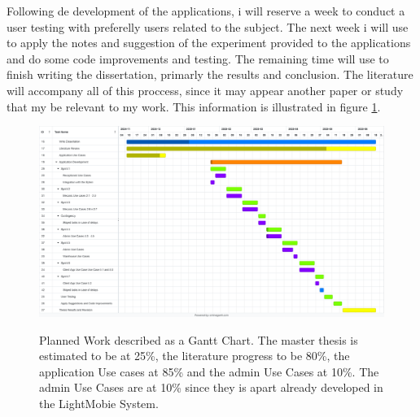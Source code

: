   Following de development of the applications, i will reserve a week to conduct a user testing with preferelly users related to the subject.
  The next week i will use to apply the notes and suggestion of the experiment provided to the applications and do some code improvements and testing.
  The remaining time will use to finish writing the dissertation, primarly the results and conclusion.
  The literature will accompany all of this proccess, since it may appear another paper or study that my be relevant to my work.
  This information is illustrated in figure \ref{fig:figure1}.

    \begin{figure}[h]
      \caption{Planned Work described as a Gantt Chart. The master thesis is estimated to be at 25\%, the literature progress to be 80\%, the application Use cases at 85\% and the admin Use Cases at 10\%. The admin Use Cases are at 10\% since they is apart already developed in the LightMobie System.}
      \centering
      \includegraphics[width=\textwidth]{figs/Gantt}
      \label{fig:figure1}
    \end{figure}
